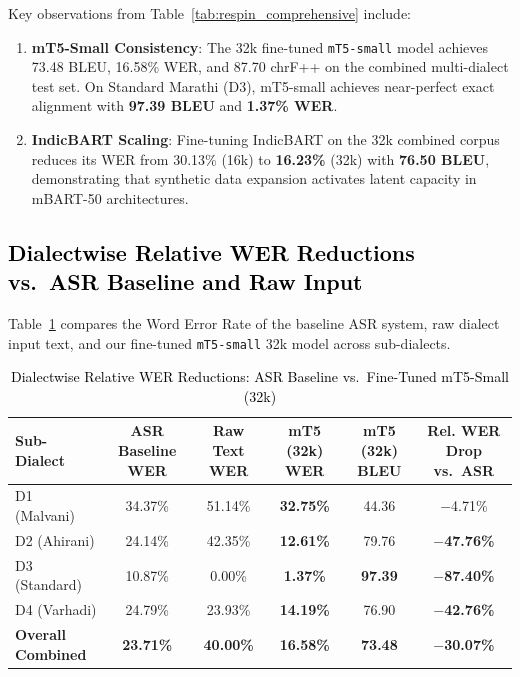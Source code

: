 Key observations from Table~\ref{tab:respin_comprehensive} include:
\begin{enumerate}
    \item \textbf{mT5-Small Consistency}: The 32k fine-tuned \texttt{mT5-small} model achieves 73.48 BLEU, 16.58\% WER, and 87.70 chrF++ on the combined multi-dialect test set. On Standard Marathi (D3), mT5-small achieves near-perfect exact alignment with \textbf{97.39 BLEU} and \textbf{1.37\% WER}.
    \item \textbf{IndicBART Scaling}: Fine-tuning IndicBART on the 32k combined corpus reduces its WER from 30.13\% (16k) to \textbf{16.23\%} (32k) with \textbf{76.50 BLEU}, demonstrating that synthetic data expansion activates latent capacity in mBART-50 architectures.
\end{enumerate}

\subsection{\textcolor{black}{Dialectwise Relative WER Reductions vs.\ ASR Baseline and Raw Input}}

Table~\ref{tab:wer_reductions} compares the Word Error Rate of the baseline ASR system, raw dialect input text, and our fine-tuned \texttt{mT5-small} 32k model across sub-dialects.

\begin{table}[t]
\color{black}
\centering
\caption{\textcolor{black}{Dialectwise Relative WER Reductions: ASR Baseline vs.\ Fine-Tuned mT5-Small (32k)}}
\label{tab:wer_reductions}
\begin{tabularx}{\textwidth}{lccccc}
\hline
\textbf{Sub-Dialect} & \textbf{ASR Baseline WER} & \textbf{Raw Text WER} & \textbf{mT5 (32k) WER} & \textbf{mT5 (32k) BLEU} & \textbf{Rel. WER Drop vs.\ ASR} \\
\hline
D1 (Malvani) & 34.37\% & 51.14\% & \textbf{32.75\%} & 44.36 & $-$4.71\% \\
D2 (Ahirani) & 24.14\% & 42.35\% & \textbf{12.61\%} & 79.76 & \textbf{$-$47.76\%} \\
D3 (Standard) & 10.87\% & 0.00\% & \textbf{1.37\%} & \textbf{97.39} & \textbf{$-$87.40\%} \\
D4 (Varhadi) & 24.79\% & 23.93\% & \textbf{14.19\%} & 76.90 & \textbf{$-$42.76\%} \\
\hline
\textbf{Overall Combined} & \textbf{23.71\%} & \textbf{40.00\%} & \textbf{16.58\%} & \textbf{73.48} & \textbf{$-$30.07\%} \\
\hline
\end{tabularx}
\end{table}

